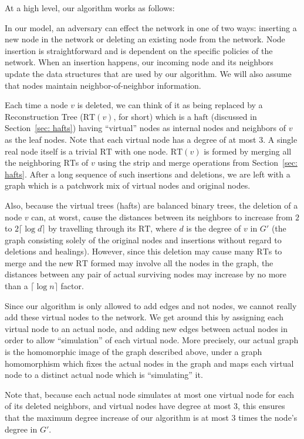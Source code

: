\documentclass[11pt, letter]{article}
\newcommand{\RT}{\mathrm{RT}}
\newcommand{\haft}{\mathrm{haft}}
\begin{document}
At a high level, our algorithm works as follows:

In our model, an adversary can effect the network in one of two ways: inserting a new node in the network or deleting an
existing node from the network. Node insertion is straightforward and is dependent on the specific policies of the
network. When an insertion happens, our incoming node and its neighbors update the data structures that are
used by our algorithm. We will also assume that nodes maintain neighbor-of-neighbor information.

Each time a node $v$ is deleted, we can think of it as being replaced by a Reconstruction Tree ($\RT(v)$, for short) which
is a  $\haft$ (discussed in  Section~\ref{sec: hafts}) having ``virtual'' nodes as internal nodes and
neighbors of $v$ as the leaf nodes. Note that each virtual node has a degree of at most  $3$. A single real node itself is a trivial $\RT$ with one node.
$\RT(v)$ is formed by merging all the neighboring $\RT$s of
$v$ using the strip and merge operations from Section~\ref{sec: hafts}.
After a long sequence of such insertions and deletions, we are left with a graph which is a patchwork mix of virtual
nodes and original nodes. 



Also, because the virtual trees (hafts) are balanced binary trees, the deletion of a node $v$ can, at worst, cause the
distances between its neighbors to increase from $2$ to $2 \lceil \log d  \rceil$ by travelling through its $\RT$, where 
$d$ is the degree of $v$ in $G'$ (the graph consisting solely of the original nodes and insertions without regard to
deletions and healings). 
However, since this deletion may cause many $\RT$s to merge and the new $\RT$ formed may
involve all the nodes in the graph, the distances between any pair of actual surviving nodes may increase by no
 more than a $\lceil \log n \rceil$ factor.
 
Since our algorithm is only allowed to add edges and not nodes, 
we cannot really add these virtual nodes to the network.
We get around this by assigning each virtual node to an actual
node, and adding new edges between actual nodes in order to 
allow ``simulation'' of each virtual node.  More precisely,
our actual graph is the homomorphic image of the graph
described above, under a graph homomorphism which fixes 
the actual nodes in the graph and maps each virtual node
to a distinct actual node which is ``simulating'' it.



Note that, because each actual node simulates at most one
virtual node for each of its deleted neighbors, and virtual nodes have degree at most $3$,
this ensures that the maximum degree increase of our algorithm
is at most $3$ times the node's degree in $G'$.
\end{document}
